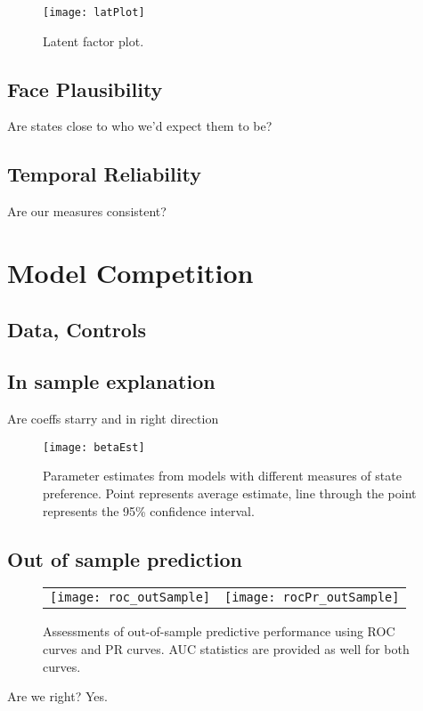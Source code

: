 \begin{figure}[ht]
	\centering
	\texttt{[image: latPlot]}
	\caption{Latent factor plot.}
	\label{fig:latPlot}
\end{figure}

\subsection{Face Plausibility}

Are states close to who we'd expect them to be?

\subsection{Temporal Reliability}

Are our measures consistent?

\section{Model Competition}

\subsection{Data, Controls}

\subsection{In sample explanation}

Are coeffs starry and in right direction

\begin{figure}[ht]
	\centering
	\texttt{[image: betaEst]}
	\caption{Parameter estimates from models with different measures of state preference. Point represents average estimate, line through the point represents the 95\% confidence interval.}
	\label{fig:coefP}
\end{figure}
\FloatBarrier

\subsection{Out of sample prediction}

\begin{figure}[ht]
	\centering
	\begin{tabular}{cc}
	\texttt{[image: roc\_outSample]} & 
	\texttt{[image: rocPr\_outSample]}	
	\end{tabular}
	\caption{Assessments of out-of-sample predictive performance using ROC curves and PR curves. AUC statistics are provided as well for both curves.}
	\label{fig:roc}
\end{figure}
\FloatBarrier

Are we right? Yes.
